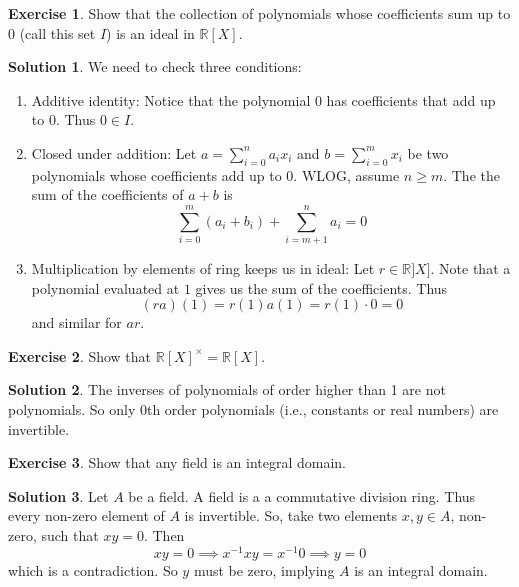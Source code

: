 \documentclass[12pt]{article}
\theoremstyle{definition}
\newcommand{\R}{\mathbb{R}}
\newtheorem{exercise}{\color{YellowOrange}Exercise}
\theoremstyle{definition}
\newtheorem{solution}{\color{Goldenrod}Solution}
\begin{document}
\begin{exercise}
	Show that the collection of polynomials whose coefficients sum up to 0 (call this set $I$) is an ideal in $\R[X]$. 
\end{exercise}
\begin{solution}
	We need to check three conditions:
	\begin{enumerate}
		\item Additive identity: Notice that the polynomial $0$ has coefficients that add up to 0. Thus $0 \in I$. 
		\item Closed under addition: Let $a = \sum_{i=0}^n a_i x_i$ and $b=\sum_{i=0}^m x_i$ be two polynomials whose coefficients add up to 0. WLOG, assume $n \geq m$. The the sum of the coefficients of $a + b$ is 
		\begin{equation}
			\sum_{i=0}^m (a_i + b_i) + \sum_{i=m+1}^n a_i = 0
		\end{equation}
		\item Multiplication by elements of ring keeps us in ideal: Let $r \in \R]X]$. Note that a polynomial evaluated at $1$ gives us the sum of the coefficients. Thus
		\begin{equation}
			(ra)(1) = r(1)a(1) = r(1)\cdot 0 = 0
		\end{equation}
		and similar for $ar$. 
	\end{enumerate}
\end{solution}

\begin{exercise}
	Show that $\R[X]^{\times} = \R[X]$.
\end{exercise}
\begin{solution}
	The inverses of polynomials of order higher than 1 are not polynomials. So only 0th order polynomials (i.e., constants or real numbers) are invertible. 
\end{solution}

\begin{exercise}
	Show that any field is an integral domain.
\end{exercise}
\begin{solution}
	Let $A$ be a field. A field is a a commutative division ring. Thus every non-zero element of $A$ is invertible. So, take two elements $x,y \in A$, non-zero, such that $xy = 0$. Then
	\begin{equation}
		xy = 0 \implies x^{-1}xy = x^{-1}0 \implies y = 0
	\end{equation}
	which is a contradiction. So $y$ must be zero, implying $A$ is an integral domain. 
\end{solution}
\end{document}
